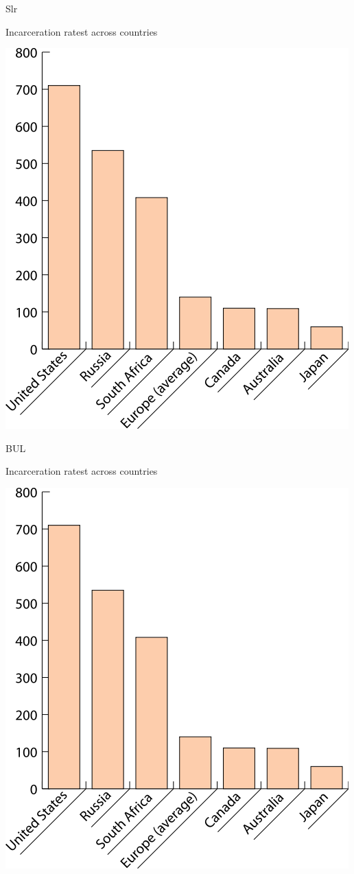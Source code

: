 \begin{chart}{S}{lr}
\caption{Incarceration ratest across countries}
\label{chart:incarceration}
\includegraphics[width=\chartwidth,height=\chartheight]{incarceration}  
\end{chart}

\lipsum[1-4]

\begin{chart}{B}{UL}
\caption{Incarceration ratest across countries}
\label{chart:incarceration}
\includegraphics[width=\chartwidth,height=\chartheight]{incarceration}  
\end{chart}


